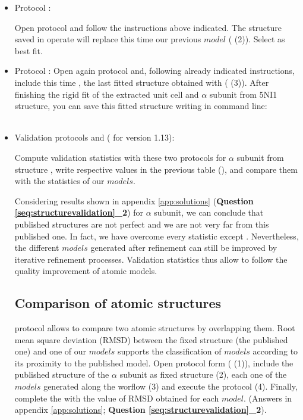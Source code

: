 \begin{itemize}
    \item Protocol :
    
    Open \powerfit protocol and follow the instructions above indicated. The structure saved in \chimera operate will replace this time our previous $model$ ( (2)). Select  as best fit.\\
    
    \item Protocol :
    Open again \chimera {} protocol and, following already indicated instructions, include this time , the last fitted structure obtained with \powerfit ( (3)). After finishing the rigid fit of the extracted unit cell and  $\alpha$ subunit from 5NI1 structure, you can save this fitted structure writing in \chimera command line:\\
    \\
    
    \item{Validation protocols  and  ( for \phenix version 1.13)}:
    
    Compute validation statistics with these two protocols for  $\alpha$ subunit from  structure , write respective values in the previous table (), and compare them with the statistics of our $models$.
    
    Considering results shown in appendix \ref{app:solutions} (\textbf{Question \ref{seq:structurevalidation}\_2}) for  $\alpha$ subunit, we can conclude that published structures are not perfect and we are not very far from this published one. In fact, we have overcome every statistic except \ccmask. Nevertheless, the different $models$ generated after \coot refinement can still be improved by iterative refinement processes. Validation statistics thus allow to follow the quality improvement of atomic models.\\

 
  \subsection*{Comparison of atomic structures}
  
  \phenix protocol  allows to compare two atomic structures by overlapping them. Root mean square deviation (RMSD) between the fixed structure (the published one) and one of our $models$ supports the classification of $models$ according to its proximity to the published model. Open \phenix {} protocol form ( (1)), include the published structure of the  $\alpha$ subunit as fixed structure (2), each one of the $models$ generated along the worflow (3) and execute the protocol (4). Finally, complete the  with the value of RMSD obtained for each $model$. (Answers in appendix \ref{app:solutions}; \textbf{Question \ref{seq:structurevalidation}\_2}).
  

\end{itemize}
